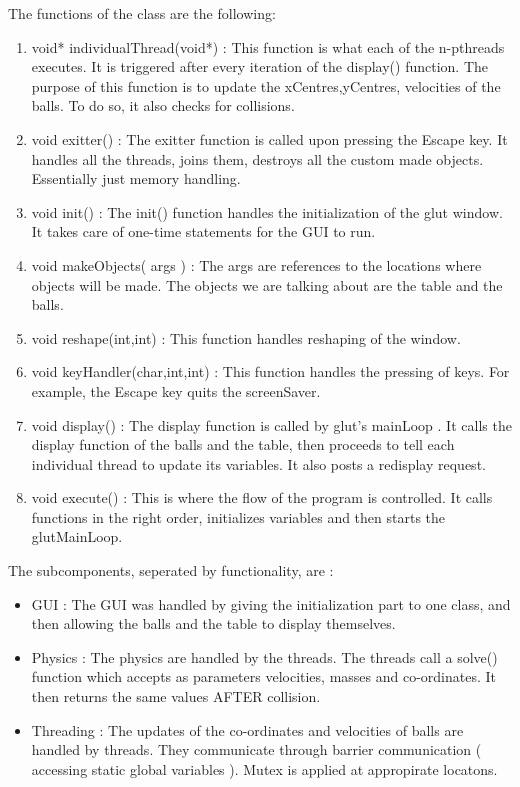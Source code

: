 \documentclass[]{article}
\begin{document}
\begin{flushleft}
The functions of the class are the following:
\begin{enumerate}
\item void* individualThread(void*) : This function is what each of the n-pthreads executes. It is triggered after every iteration of the display() function. The purpose of this function is to update the xCentres,yCentres, velocities of the balls. To do so, it also checks for collisions.
\item void exitter() : The exitter function is called upon pressing the Escape key. It handles all the threads, joins them, destroys all the custom made objects. Essentially just memory handling.
\item void init() : The init() function handles the initialization of the glut window. It takes care of one-time statements for the GUI to run.
\item void makeObjects( args ) : The args are references to the locations where objects will be made. The objects we are talking about are the table and the balls. 
\item void reshape(int,int) : This function handles reshaping of the window.
\item void keyHandler(char,int,int) : This function handles the pressing of keys. For example, the Escape key quits the screenSaver.
\item void display() : The display function is called by glut's mainLoop . It calls the display function of the balls and the table, then proceeds to tell each individual thread to update its variables. It also posts a redisplay request.
\item void execute() : This is where the flow of the program is controlled. It calls functions in the right order, initializes variables and then starts the glutMainLoop.
\end{enumerate}

The subcomponents, seperated by functionality, are :
\begin{itemize}
\item GUI : The GUI was handled by giving the initialization part to one class, and then allowing the balls and the table to display themselves.
\item Physics : The physics are handled by the threads. The threads call a solve() function which accepts as parameters velocities, masses and co-ordinates. It then returns the same values AFTER collision.
\item Threading : The updates of the co-ordinates and velocities of balls are handled by threads. They communicate through barrier communication ( accessing static global variables ). Mutex is applied at appropirate locatons.
\end{itemize}
 
\end{flushleft}
\end{document}

